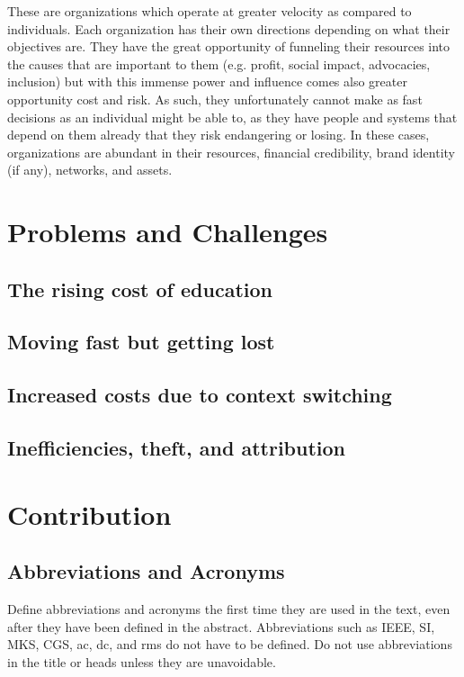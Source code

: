 \documentclass[conference]{IEEEtran}
\begin{document}
These are organizations which operate at greater velocity as compared to individuals.
Each organization has their own directions depending on what their objectives are.
They have the great opportunity of funneling their resources into the causes that
are important to them (e.g. profit, social impact, advocacies, inclusion) but with
this immense power and influence comes also greater opportunity cost and risk. As
such, they unfortunately cannot make as fast decisions as an individual might be 
able to, as they have people and systems that depend on them already that they risk
endangering or losing. In these cases, organizations are abundant in their resources,
financial credibility, brand identity (if any), networks, and assets.

\section{Problems and Challenges} 
\label{sec:problems_challenges}

\subsection{The rising cost of education}

\subsection{Moving fast but getting lost}

\subsection{Increased costs due to context switching}

\subsection{Inefficiencies, theft, and attribution}


\section{Contribution}
\label{sec:contribution}

\subsection{Abbreviations and Acronyms}\label{AA}
Define abbreviations and acronyms the first time they are used in the text, 
even after they have been defined in the abstract. Abbreviations such as 
IEEE, SI, MKS, CGS, ac, dc, and rms do not have to be defined. Do not use 
abbreviations in the title or heads unless they are unavoidable.
\end{document}
